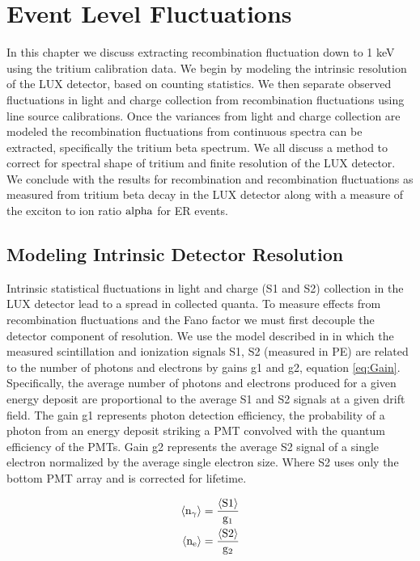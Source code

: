 \renewcommand{\thechapter}{5}

\chapter{Event Level Fluctuations}
\label{Ch:Flucs}

In this chapter we discuss extracting recombination fluctuation down to 1 keV using the tritium calibration data. We begin by modeling the intrinsic resolution of the LUX detector, based on counting statistics. We then separate observed fluctuations in light and charge collection from recombination fluctuations using line source calibrations. Once the variances from light and charge collection are modeled the recombination fluctuations from continuous spectra can be extracted, specifically the tritium beta spectrum. We all discuss a method to correct for spectral shape of tritium and finite resolution of the LUX detector. We conclude with the results for recombination and recombination fluctuations as measured from tritium beta decay in the LUX detector along with a measure of the exciton to ion ratio $\rm alpha$ for ER events.


\section{Modeling Intrinsic Detector Resolution}

Intrinsic statistical fluctuations in light and charge (S1 and S2) collection in the LUX detector lead to a spread in collected quanta. To measure effects from recombination fluctuations and the Fano factor we must first decouple the detector component of resolution. We use the model described in \cite{Dahl_Thesis} in which the measured scintillation and ionization signals S1, S2 (measured in PE) are related to the number of photons and electrons by gains g1 and g2, equation \ref{eq:Gain}. Specifically, the average number of photons and electrons produced for a given energy deposit are proportional to the average S1 and S2 signals at a given drift field. The gain g1 represents photon detection efficiency, the probability of a photon from an energy deposit striking a PMT convolved with the quantum efficiency of the PMTs. Gain g2 represents the average S2 signal of a single electron normalized by the average single electron size. Where S2 uses only the bottom PMT array and is corrected for lifetime.


\begin{equation}
\begin{split}
\rm  \left<n_\gamma\right> = \frac{\left<S1\right>}{g_1}\\
\rm \left<n_{e}\right> = \frac{\left<S2\right>}{g_2}
\label{eq:Gain}
\end{split}
\end{equation}

